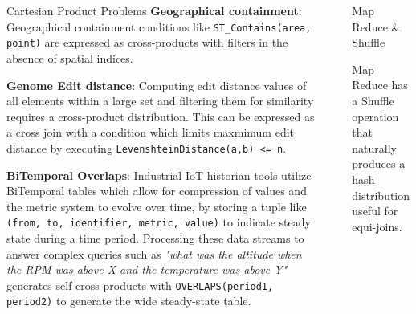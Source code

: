 \documentclass[final]{beamer}
\newlength{\sepwid}
\newlength{\onecolwid}
\newlength{\twocolwid}
\begin{document}
\begin{frame}[t]
\begin{columns}[t]
\begin{column}{\onecolwid}
\begin{block}{Cartesian Product Problems}
\textbf{Geographical containment}:
Geographical containment conditions like \texttt{ST\_Contains(area, point)} are expressed as cross-products with filters in the absence of spatial indices.

\textbf{Genome Edit distance}:
Computing edit distance values of all elements within a large set and filtering them for similarity requires a cross-product distribution. This can 
be expressed as a cross join with a condition which limits maxmimum edit distance by executing \texttt{LevenshteinDistance(a,b) <= n}.

\textbf{BiTemporal Overlaps}:
Industrial IoT historian tools utilize BiTemporal tables which allow for compression of values and the metric system to evolve over time, by storing a
tuple like \texttt{(from, to, identifier, metric, value)} to indicate steady state during a time period.
Processing these data streams to answer complex queries such as \textit{"what was the altitude when the RPM was above X and the temperature was above Y"}
generates self cross-products with \texttt{OVERLAPS(period1, period2)} to generate the wide steady-state table.
\end{block}


\end{column} %

\begin{column}{\sepwid}\end{column} %

\begin{column}{\twocolwid} %

\begin{columns}[t,totalwidth=\twocolwid] %

\begin{column}{\onecolwid}\vspace{-.6in} %


\begin{block}{Map Reduce \& Shuffle}

Map Reduce has a Shuffle operation that naturally produces a hash distribution useful for equi-joins.


\end{block}
\end{column}
\end{columns}
\end{column}
\end{columns}
\end{frame}
\end{document}
